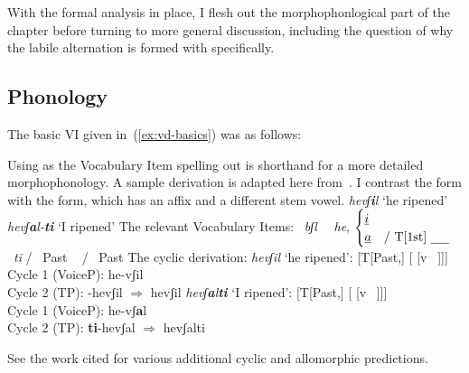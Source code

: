 With the formal analysis in place, I flesh out the morphophonlogical part of the chapter before turning to more general discussion, including the question of why the labile alternation is formed with {\vd} specifically.

	
	\subsection{Phonology} \label{vd:vd:phono}
The basic VI given in~(\ref{ex:vd-basics}) was as follows:
\ex {\vd} {\lra} {\thif}
\xe

Using {\thif} as the Vocabulary Item spelling out {\vd} is shorthand for a more detailed morphophonology. A sample derivation is adapted here from~\cite{kastner18nllt}. I contrast the  form with the  form, which has an affix and a different stem vowel.
\pex
	\a \emph{hevʃ\textbf{i}l} `he ripened'
	\a \emph{hevʃ\textbf{a}l-\textbf{ti}} `I ripened'
\xe
The relevant Vocabulary Items:
\pex
	\a {} \lra~\emph{bʃl}
	\a 	\vd~\lra~\emph{he}, $\begin{cases}
			\emph{i}\\
			\emph{a} & \text{/ T[1st] \trace}
			\end{cases}$
	 \lra~\emph{ti} / \trace~Past
	\a {} \lra~{\zero} / \trace~Past
\xe
The cyclic derivation:
\pex
	\a \emph{hevʃil} `he ripened': [T[Past,] [{\vd} [v ~\!]]]\\
	Cycle 1 (VoiceP): he-vʃil\\
	Cycle 2 (TP): {\zero}-hevʃil $\Rightarrow$ hevʃil
	\a \emph{hevʃ\textbf{a}l\textbf{ti}} `I ripened': [T[Past,] [{\vd} [v ~\!]]] \\
	Cycle 1 (VoiceP): he-vʃ\textbf{a}l\\
	Cycle 2 (TP): \textbf{ti}-hevʃal $\Rightarrow$ hevʃalti
\xe	

See the work cited for various additional cyclic and allomorphic predictions.

		


